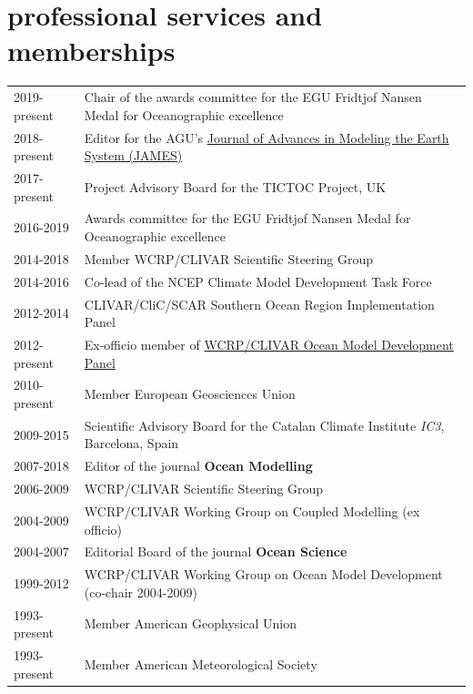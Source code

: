 \documentclass{article}
\begin{document}
\section*{\sc  \color{Maroon}  professional services and memberships}
\vspace{-.25cm}

\begin{tabular}{ll}
  2019-present & Chair of the awards committee for the EGU Fridtjof Nansen Medal for Oceanographic excellence 
  \\
2018-present & Editor for the AGU's  \href{http://agupubs.onlinelibrary.wiley.com/hub/journal/10.1002/(ISSN)1942-2466/editorial-board/editorial-board.html}{Journal of Advances in Modeling the Earth System (JAMES)}  
\\
2017-present & Project Advisory Board for the TICTOC Project, UK
\\
  2016-2019 & Awards committee for the EGU Fridtjof Nansen Medal for Oceanographic excellence 
  \\
2014-2018 &  Member  WCRP/CLIVAR Scientific Steering Group \\
2014-2016     & Co-lead of the NCEP Climate Model Development Task Force\\
2012-2014     & CLIVAR/CliC/SCAR Southern Ocean Region Implementation Panel \\
2012-present & Ex-officio member of \href{http://www.clivar.org/clivar-panels/omdp}{WCRP/CLIVAR Ocean Model Development Panel} \\
2010-present & Member European Geosciences Union \\
2009-2015     &  Scientific Advisory Board for the Catalan  Climate Institute {\it IC3}, Barcelona, Spain \\
2007-2018 & Editor of the journal {\bf Ocean Modelling} \\
2006-2009     &  WCRP/CLIVAR Scientific Steering Group \\
2004-2009     &  WCRP/CLIVAR Working Group on Coupled Modelling (ex officio) \\
2004-2007     & Editorial Board of the journal {\bf Ocean Science} \\
1999-2012     & WCRP/CLIVAR Working Group on Ocean Model Development  (co-chair 2004-2009) \\
1993-present  & Member American Geophysical Union \\
1993-present  & Member American Meteorological Society \\
\end{tabular}
\end{document}
